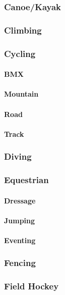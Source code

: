 			\subsubsection{Canoe/Kayak}
			\subsubsection{Climbing}
			\subsubsection{Cycling}
				\paragraph{BMX}
				\paragraph{Mountain}
				\paragraph{Road}
				\paragraph{Track}
			\subsubsection{Diving}
			\subsubsection{Equestrian}
				\paragraph{Dressage}
				\paragraph{Jumping}
				\paragraph{Eventing}
			\subsubsection{Fencing}
			\subsubsection{Field Hockey}
